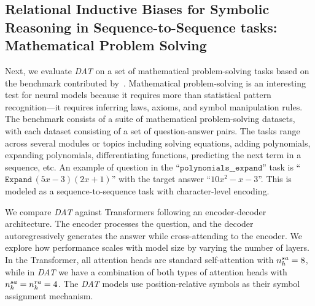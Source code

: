 

\subsection{Relational Inductive Biases for Symbolic Reasoning in Sequence-to-Sequence tasks: Mathematical Problem Solving}\label{ssec:math}

Next, we evaluate \textit{DAT} on a set of mathematical problem-solving tasks based on the benchmark contributed by~\citet{saxtonAnalyzingMathematicalReasoning2019}. Mathematical problem-solving is an interesting test for neural models because it requires more than statistical pattern recognition---it requires inferring laws, axioms, and symbol manipulation rules. The benchmark consists of a suite of mathematical problem-solving datasets, with each dataset consisting of a set of question-answer pairs. The tasks range across several modules or topics including solving equations, adding polynomials, expanding polynomials, differentiating functions, predicting the next term in a sequence, etc. An example of question in the ``$\mathtt{polynomials\_\_expand}$'' task is ``$\mathtt{Expand}\, (5x-3)(2x+1)$'' with the target answer ``$10x^2 -x -3$''. This is modeled as a sequence-to-sequence task with character-level encoding.

We compare \textit{DAT} against Transformers following an encoder-decoder architecture. The encoder processes the question, and the decoder autoregressively generates the answer while cross-attending to the encoder. We explore how performance scales with model size by varying the number of layers. In the Transformer, all attention heads are standard self-attention with $n_h^{sa} = 8$, while in \textit{DAT} we have a combination of both types of attention heads with $n_h^{sa} = n_h^{ra} = 4$. The \textit{DAT} models use position-relative symbols as their symbol assignment mechanism.

